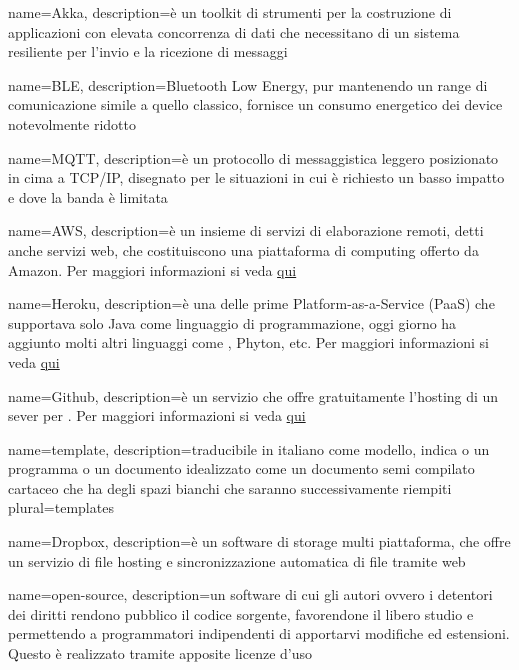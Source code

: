  {
	name=Akka,
	description={è un toolkit di strumenti per la costruzione di applicazioni con elevata concorrenza di dati che necessitano di un sistema resiliente per l'invio e la ricezione di messaggi}
}

 {
	name=BLE,
	description={Bluetooth Low Energy,  pur mantenendo un range di comunicazione simile a quello classico, fornisce un  consumo energetico dei device notevolmente ridotto}
}

 {
	name=MQTT,
	description={è un protocollo di messaggistica leggero posizionato in cima a TCP/IP, disegnato per le situazioni in cui è richiesto un basso impatto e dove la banda è limitata }
}

 {
	name=AWS,
	description={è un insieme di servizi di elaborazione remoti, detti anche servizi web, che costituiscono una piattaforma di computing offerto da Amazon. Per maggiori informazioni si veda \href{https://aws.amazon.com/it/}{qui}}
}

 {
	name=Heroku,
	description={è una  delle prime  Platform-as-a-Service (PaaS) che supportava solo Java come linguaggio di programmazione, oggi giorno ha aggiunto molti altri linguaggi come , Phyton, etc. Per maggiori informazioni si veda \href{https://www.heroku.com}{qui}}
}

 {
	name=Github,
	description={è un servizio che offre gratuitamente l'hosting di un sever per . Per maggiori informazioni si veda \href{https://github.com}{qui}}
}

 {
	name=template,
	description={traducibile in italiano come modello, indica o un programma o un documento idealizzato come un documento semi compilato cartaceo che ha degli spazi bianchi che saranno successivamente riempiti}
	plural=templates
}

 {
	name=Dropbox,
	description={è un software di  storage multi piattaforma, che offre un servizio di file hosting e sincronizzazione automatica di file tramite web}
}

 {
	name=open-source,
	description={un software di cui gli autori ovvero i detentori dei diritti rendono pubblico il codice sorgente, favorendone il libero studio e permettendo a programmatori indipendenti di apportarvi modifiche ed estensioni. Questo è realizzato tramite apposite licenze d'uso}
}

